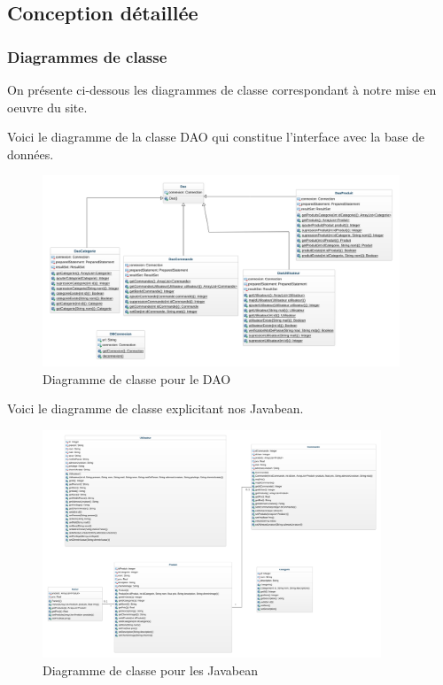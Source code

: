 \clearpage

\subsection{Conception détaillée}
\subsubsection{Diagrammes de classe}
On présente ci-dessous les diagrammes de classe correspondant à notre mise en oeuvre du site.

Voici le diagramme de la classe DAO qui constitue l'interface avec la base de données.
\begin{figure}[H]
\begin{centering}
\includegraphics[width=0.95\textwidth,height=0.5\textheight]{Ressources/class-diagram-dao.png}
\caption{Diagramme de classe pour le DAO}
\par
\end{centering}
\end{figure}

\clearpage

Voici le diagramme de classe explicitant nos Javabean.
\begin{figure}[H]
\begin{centering}
\includegraphics[width=0.9\textwidth,height=0.7\textheight]{Ressources/class-diagram-bean.png}
\caption{Diagramme de classe pour les Javabean}
\par
\end{centering}
\end{figure}

